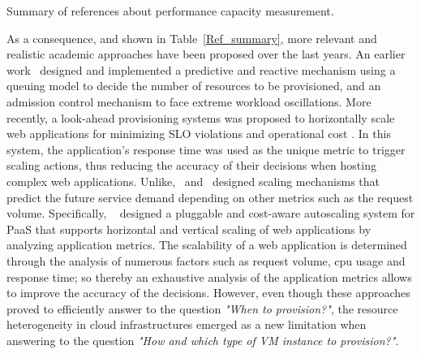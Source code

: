 \begin{table*}
{\caption{Summary of references about performance capacity measurement.}
\label{Ref_summary}
}
\end{table*}

As a consequence, and shown in Table~\ref{Ref_summary}, more relevant and realistic academic approaches have been proposed over the last years. An earlier work~\cite{urgaonkar_agile_2008} designed and implemented a predictive and reactive mechanism using a queuing model to decide the number of resources to be provisioned, and an admission control mechanism to face extreme workload oscillations. More recently, a look-ahead provisioning systems was proposed to horizontally scale web applications for minimizing SLO violations and operational cost \cite{roy_efficient_2011}. In this system, the application's response time was used as the unique metric to trigger scaling actions, thus reducing the accuracy of their decisions when hosting complex web applications. Unlike,~\cite{ali-eldin_2012} and~\cite{bunch_2012} designed scaling mechanisms that predict the future service demand depending on other metrics such as the request volume. Specifically, ~\cite{bunch_2012} designed a pluggable and cost-aware autoscaling system for PaaS that supports horizontal and vertical scaling of web applications by analyzing application metrics. The scalability of a web application is determined through the analysis of numerous factors such as request volume, cpu usage and response time; so thereby an exhaustive analysis of the application metrics allows to improve the accuracy of the decisions. However, even though these approaches proved to efficiently answer to the question \emph{"When to provision?"}, the resource heterogeneity in cloud infrastructures emerged as a new limitation when answering to the question \emph{"How and which type of VM instance to provision?"}.






